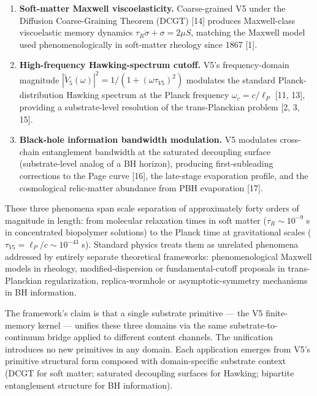 \documentclass[
  11pt,
  a4paperpaper,
]{article}
\begin{document}
\begin{enumerate}
\def\labelenumi{\arabic{enumi}.}
\item
  \textbf{Soft-matter Maxwell viscoelasticity.} Coarse-grained V5 under
  the Diffusion Coarse-Graining Theorem (DCGT) {[}14{]} produces
  Maxwell-class viscoelastic memory dynamics
  \(\tau_R \dot\sigma + \sigma = 2\mu S\), matching the Maxwell model
  used phenomenologically in soft-matter rheology since 1867 {[}1{]}.
\item
  \textbf{High-frequency Hawking-spectrum cutoff.} V5's frequency-domain
  magnitude \(|\tilde V_5(\omega)|^2 = 1/(1+(\omega\tau_{V5})^2)\)
  modulates the standard Planck-distribution Hawking spectrum at the
  Planck frequency \(\omega_c = c/\ell_P\) {[}11, 13{]}, providing a
  substrate-level resolution of the trans-Planckian problem {[}2, 3,
  15{]}.
\item
  \textbf{Black-hole information bandwidth modulation.} V5 modulates
  cross-chain entanglement bandwidth at the saturated decoupling surface
  (substrate-level analog of a BH horizon), producing first-subleading
  corrections to the Page curve {[}16{]}, the late-stage evaporation
  profile, and the cosmological relic-matter abundance from PBH
  evaporation {[}17{]}.
\end{enumerate}

These three phenomena span scale separation of approximately forty
orders of magnitude in length: from molecular relaxation times in soft
matter (\(\tau_R \sim 10^{-9}\) s in concentrated biopolymer solutions)
to the Planck time at gravitational scales
(\(\tau_{V5} = \ell_P/c \sim 10^{-43}\) s). Standard physics treats them
as unrelated phenomena addressed by entirely separate theoretical
frameworks: phenomenological Maxwell models in rheology,
modified-dispersion or fundamental-cutoff proposals in trans-Planckian
regularization, replica-wormhole or asymptotic-symmetry mechanisms in BH
information.

The framework's claim is that a single substrate primitive --- the V5
finite-memory kernel --- unifies these three domains via the same
substrate-to-continuum bridge applied to different content channels. The
unification introduces no new primitives in any domain. Each application
emerges from V5's primitive structural form composed with
domain-specific substrate context (DCGT for soft matter; saturated
decoupling surfaces for Hawking; bipartite entanglement structure for BH
information).
\end{document}
